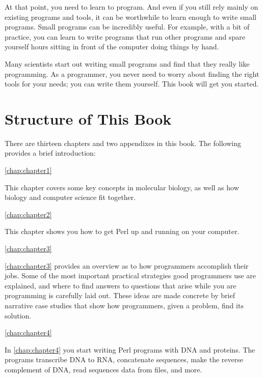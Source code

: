 At that point, you need to learn to program. And even if you still rely mainly on existing programs and tools, it can be worthwhile to learn enough to write small programs. Small programs can be incredibly useful. For example, with a bit of practice, you can learn to write programs that run other programs and spare yourself hours sitting in front of the computer doing things by hand.

Many scientists start out writing small programs and find that they really like programming. As a programmer, you never need to worry about finding the right tools for your needs; you can write them yourself. This book will get you started.

\section*{Structure of This Book}
There are thirteen chapters and two appendixes in this book. The following provides a brief introduction:

\autoref{chap:chapter1}
\begin{adjustwidth}{1cm}{0cm}
This chapter covers some key concepts in molecular biology, as well as how biology and computer science fit together.
\end{adjustwidth}

\autoref{chap:chapter2}
\begin{adjustwidth}{1cm}{0cm}
This chapter shows you how to get Perl up and running on your computer.
\end{adjustwidth}

\autoref{chap:chapter3}
\begin{adjustwidth}{1cm}{0cm}
\autoref{chap:chapter3} provides an overview as to how programmers accomplish their jobs. Some of the most important practical strategies good programmers use are explained, and where to find answers to questions that arise while you are programming is carefully laid out. These ideas are made concrete by brief narrative case studies that show how programmers, given a problem, find its solution.
\end{adjustwidth}

\autoref{chap:chapter4}
\begin{adjustwidth}{1cm}{0cm}
In \autoref{chap:chapter4} you start writing Perl programs with DNA and proteins. The programs transcribe DNA to RNA, concatenate sequences, make the reverse complement of DNA, read sequences data from files, and more.
\end{adjustwidth}

